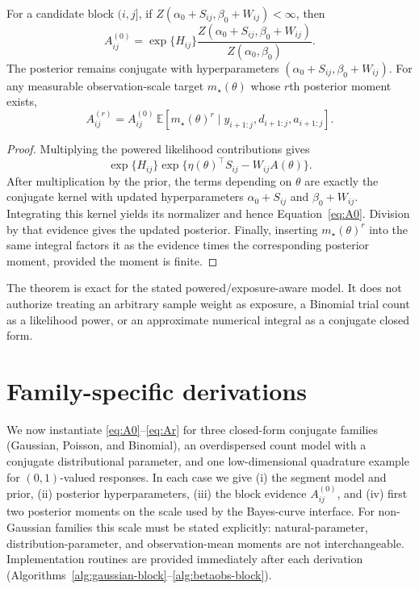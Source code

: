 \begin{theorem}
\label{thm:ef-integral}
For a candidate block $(i,j]$, if $Z(\alpha_0+S_{ij},\beta_0+W_{ij})<\infty$, then
\begin{equation}
 A^{(0)}_{ij}=\exp\{H_{ij}\}
 \frac{Z(\alpha_0+S_{ij},\beta_0+W_{ij})}{Z(\alpha_0,\beta_0)}.
\label{eq:A0}
\end{equation}
The posterior remains conjugate with hyperparameters
$(\alpha_0+S_{ij},\beta_0+W_{ij})$. For any measurable observation-scale target $m_\star(\theta)$ whose
$r$th posterior moment exists,
\begin{equation}
 A^{(r)}_{ij}=A^{(0)}_{ij}\,
 \mathbb E[m_\star(\theta)^r\mid y_{i+1:j},d_{i+1:j},a_{i+1:j}].
\label{eq:Ar}
\end{equation}
\end{theorem}
\begin{proof}
Multiplying the powered likelihood contributions gives
\[
 \exp\{H_{ij}\}\exp\{\eta(\theta)^\top S_{ij}-W_{ij}A(\theta)\}.
\]
After multiplication by the prior, the terms depending on $\theta$ are exactly the conjugate kernel
with updated hyperparameters $\alpha_0+S_{ij}$ and $\beta_0+W_{ij}$. Integrating this kernel yields
its normalizer and hence Equation~\eqref{eq:A0}. Division by that evidence gives the updated
posterior. Finally, inserting $m_\star(\theta)^r$ into the same integral factors it as the evidence times
the corresponding posterior moment, provided the moment is finite.
\end{proof}

\begin{remark}
The theorem is exact for the stated powered/exposure-aware model. It does not authorize treating an
arbitrary sample weight as exposure, a Binomial trial count as a likelihood power, or an
approximate numerical integral as a conjugate closed form.
\end{remark}
\section{Family-specific derivations}
\label{sec:families}

We now instantiate \eqref{eq:A0}--\eqref{eq:Ar} for three closed-form conjugate families
(Gaussian, Poisson, and Binomial), an overdispersed count model with a conjugate distributional
parameter, and one low-dimensional quadrature example for $(0,1)$-valued responses. In each case
we give (i) the segment model and prior, (ii) posterior hyperparameters, (iii) the block evidence
$A^{(0)}_{ij}$, and (iv) first two posterior moments on the scale used by the Bayes-curve
interface. For non-Gaussian families this scale must be stated explicitly: natural-parameter,
distribution-parameter, and observation-mean moments are not interchangeable.
Implementation routines are provided immediately after each derivation
(Algorithms~\ref{alg:gaussian-block}--\ref{alg:betaobs-block}).

